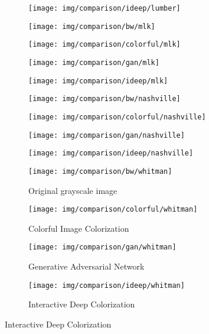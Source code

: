 \begin{figure}[!ht]
    \begin{subfigure}{.23\textwidth}
		\centering
		\texttt{[image: img/comparison/ideep/lumber]}
    \end{subfigure}
	\begin{subfigure}{.23\textwidth}
		\centering
		\texttt{[image: img/comparison/bw/mlk]}
	\end{subfigure}
    \begin{subfigure}{.23\textwidth}
		\centering
		\texttt{[image: img/comparison/colorful/mlk]}
    \end{subfigure}
    \begin{subfigure}{.23\textwidth}
		\centering
		\texttt{[image: img/comparison/gan/mlk]}
    \end{subfigure}
    \begin{subfigure}{.23\textwidth}
		\centering
		\texttt{[image: img/comparison/ideep/mlk]}
    \end{subfigure}
	\begin{subfigure}{.23\textwidth}
		\centering
		\texttt{[image: img/comparison/bw/nashville]}
	\end{subfigure}
    \begin{subfigure}{.23\textwidth}
		\centering
		\texttt{[image: img/comparison/colorful/nashville]}
    \end{subfigure}
    \begin{subfigure}{.23\textwidth}
		\centering
		\texttt{[image: img/comparison/gan/nashville]}
    \end{subfigure}
    \begin{subfigure}{.23\textwidth}
		\centering
		\texttt{[image: img/comparison/ideep/nashville]}
    \end{subfigure}
	\begin{subfigure}{.23\textwidth}
		\centering
		\texttt{[image: img/comparison/bw/whitman]}
		\caption{Original grayscale image}
	\end{subfigure}
    \begin{subfigure}{.23\textwidth}
		\centering
		\texttt{[image: img/comparison/colorful/whitman]}
		\caption{Colorful Image Colorization}
    \end{subfigure}
    \begin{subfigure}{.23\textwidth}
		\centering
		\texttt{[image: img/comparison/gan/whitman]}
		\caption{Generative Adversarial Network}
    \end{subfigure}
    \begin{subfigure}{.23\textwidth}
		\centering
		\texttt{[image: img/comparison/ideep/whitman]}
		\caption{Interactive Deep Colorization}
    \end{subfigure}
\end{figure}